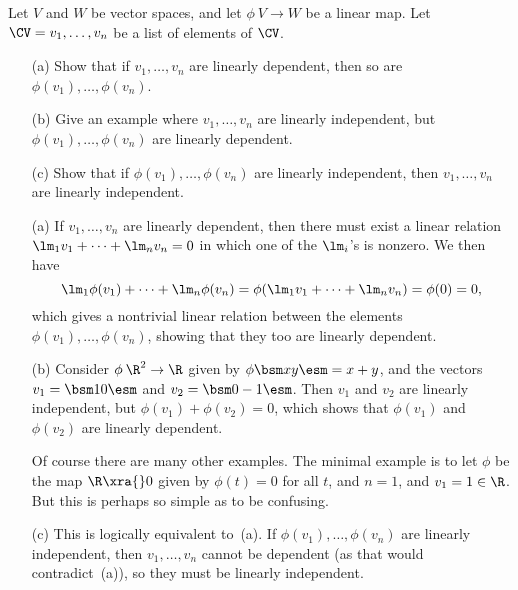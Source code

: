 \begin{exercise}\label{ex-independence-proof}
 Let $V$ and $W$ be vector spaces, and let $\phi\:V\to W$ be
 a linear map.  Let $\CV=v_1,\dotsc,v_n$ be a list of
 elements of $\CV$. 
 \begin{itemize}
  \item[(a)] Show that if $v_1,\dotsc,v_n$ are linearly
   dependent, then so are $\phi(v_1),\dotsc,\phi(v_n)$. 
  \item[(b)] Give an example where $v_1,\dotsc,v_n$ are
   linearly independent, but $\phi(v_1),\dotsc,\phi(v_n)$
   are linearly dependent. 
  \item[(c)] Show that if $\phi(v_1),\dotsc,\phi(v_n)$ are
   linearly independent, then $v_1,\dotsc,v_n$ are linearly
   independent. 
 \end{itemize}
\end{exercise}
\begin{solution}
 \begin{itemize}
  \item[(a)] If $v_1,\dotsc,v_n$ are linearly dependent,
   then there must exist a linear relation
   $\lm_1v_1+\dotsb+\lm_nv_n=0$ in which one of the
   $\lm_i$'s is nonzero.  We then have
   \[ \lm_1\phi(v_1)+\dotsb+\lm_n\phi(v_n) = 
      \phi(\lm_1v_1+\dotsb+\lm_nv_n) = \phi(0) = 0,
   \]
   which gives a nontrivial linear relation between the
   elements $\phi(v_1),\dotsc,\phi(v_n)$, showing that they
   too are linearly dependent. 
  \item[(b)] Consider $\phi\:\R^2\to\R$ given by
   $\phi\bsm x\\ y\esm=x+y$, and the vectors
   $v_1=\bsm 1\\0\esm$ and $v_2=\bsm 0\\-1\esm$.  Then $v_1$
   and $v_2$ are linearly independent, but
   $\phi(v_1)+\phi(v_2)=0$, which shows that $\phi(v_1)$ and
   $\phi(v_2)$ are linearly dependent.  

   Of course there are many other examples.  The minimal
   example is to let $\phi$ be the map $\R\xra{}0$ given by
   $\phi(t)=0$ for all $t$, and $n=1$, and $v_1=1\in\R$. 
   But this is perhaps so simple as to be confusing. 
  \item[(c)] This is logically equivalent to~(a).  If
   $\phi(v_1),\dotsc,\phi(v_n)$ are linearly independent,
   then $v_1,\dotsc,v_n$ cannot be dependent (as that would
   contradict~(a)), so they must be linearly independent. 
 \end{itemize}
\end{solution}

